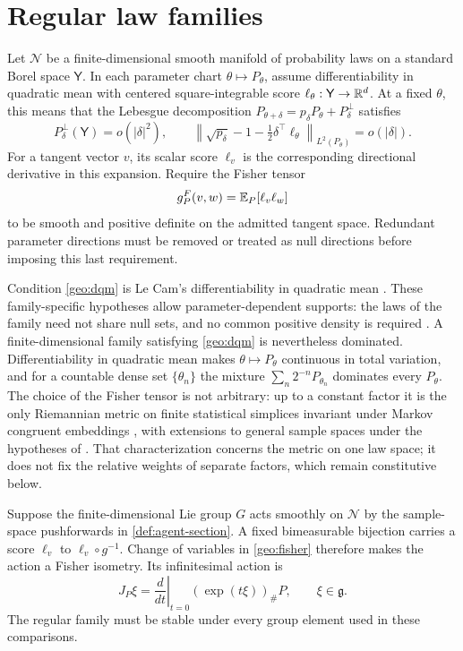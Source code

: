 \section{Regular law families}

Let $\mathcal N$ be a finite-dimensional smooth manifold of probability laws on a standard Borel space $\mathsf Y$. In each parameter chart $\theta\mapsto P_\theta$, assume differentiability in quadratic mean with centered square-integrable score $\ell_\theta:\mathsf Y\to\mathbb R^d$. At a fixed $\theta$, this means that the Lebesgue decomposition
$P_{\theta+\delta}=p_\delta P_\theta+P_\delta^\perp$ satisfies
\begin{equation}
P_\delta^\perp(\mathsf Y)=o(|\delta|^2),
\qquad
\left\|\sqrt{p_\delta}-1-\tfrac12\delta^\top\ell_\theta\right\|_{L^2(P_\theta)}
=o(|\delta|).
\label{geo:dqm}
\end{equation}
For a tangent vector $v$, its scalar score $\ell_v$ is the corresponding directional derivative in this expansion. Require the Fisher tensor
\begin{equation}
g^F_P(v,w)=\mathbb E_P[\ell_v\ell_w]
\label{geo:fisher}
\end{equation}
to be smooth and positive definite on the admitted tangent space. Redundant parameter directions must be removed or treated as null directions before imposing this last requirement.

Condition \cref{geo:dqm} is Le Cam's differentiability in quadratic mean \citep{LeCamYang2000}. These family-specific hypotheses allow parameter-dependent supports: the laws of the family need not share null sets, and no common positive density is required \citep{AyJostLeSchwachhofer2018}. A finite-dimensional family satisfying \cref{geo:dqm} is nevertheless dominated. Differentiability in quadratic mean makes $\theta\mapsto P_\theta$ continuous in total variation, and for a countable dense set $\{\theta_n\}$ the mixture $\sum_n2^{-n}P_{\theta_n}$ dominates every $P_\theta$. The choice of the Fisher tensor is not arbitrary: up to a constant factor it is the only Riemannian metric on finite statistical simplices invariant under Markov congruent embeddings \citep{Cencov1982}, with extensions to general sample spaces under the hypotheses of \citet{AyJostLeSchwachhofer2015}. That characterization concerns the metric on one law space; it does not fix the relative weights of separate factors, which remain constitutive below.

Suppose the finite-dimensional Lie group $G$ acts smoothly on $\mathcal N$ by the sample-space pushforwards in \cref{def:agent-section}. A fixed bimeasurable bijection carries a score $\ell_v$ to $\ell_v\circ g^{-1}$. Change of variables in \cref{geo:fisher} therefore makes the action a Fisher isometry. Its infinitesimal action is
\begin{equation}
J_P\xi=\left.\frac{d}{dt}\right|_{t=0}(\exp(t\xi))_\#P,
\qquad \xi\in\mathfrak g.
\label{geo:fundamental}
\end{equation}
The regular family must be stable under every group element used in these comparisons.

